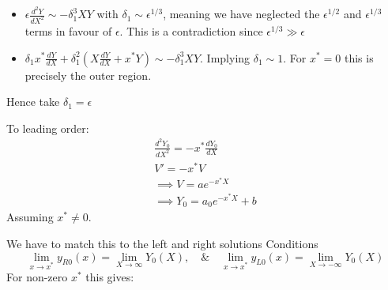 \documentclass{X:/Documents/Coding/Latex/myassignment}
\begin{document}
\begin{enumerate}
\begin{itemize}
		\item $\epsilon \frac{d^2Y}{dX^2} \sim - \delta_1^{3}XY $ with $\delta_1 \sim \epsilon^{1/3}$, meaning we have neglected the $\epsilon^{1/2}$ and $\epsilon^{1/3}$ terms in favour of $\epsilon$. This is a contradiction since $\epsilon^{1/3} \gg \epsilon$
		\item $\delta_1 x^*\frac{dY}{dX} + \delta_1^2\left( X\frac{dY}{dX} + x^*Y\right)\sim - \delta_1^{3}XY$. Implying $\delta_1 \sim 1$. For $x^* = 0$ this is precisely the outer region.
	\end{itemize}
	Hence take $\delta_1 = \epsilon$

	To leading order:
	\begin{align*}
	\frac{d^2Y_0}{dX^2} = - x^*\frac{dY_0}{dX}\\
	V' = -x^* V\\
	\implies V = ae^{-x^* X}\\
	\implies Y_0 =a_0 e^{-x^* X} +b
	\end{align*}
	Assuming $x^* \neq 0$.

	We have to match this to the left and right solutions
	Conditions
	\[\lim_{x\to x^*} y_{R0}(x) = \lim_{X\to\infty} Y_0(X), \quad \& \quad \lim_{x\to x^*} y_{L0}(x) = \lim_{X\to-\infty} Y_0(X)\]
	For non-zero $x^*$ this gives:


\end{enumerate}
\end{document}
